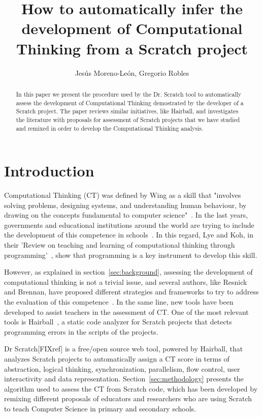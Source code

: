 \documentclass[a4paper,11pt]{article}
\title{How to automatically infer the development of Computational Thinking from a Scratch project}
\author{Jesús Moreno-León, Gregorio Robles}
\begin{document}
\maketitle

\begin{abstract}
In this paper we present the procedure used by the Dr. Scratch tool to automatically assess the development of Computational Thinking  demostrated by the developer of a Scratch project. The paper reviews similar initiatives, like Hairball, and investigates the literature with proposals for assessment of Scratch projects that we have studied and remixed in order to develop the Computational Thinking analysis.

\end{abstract}

\section{Introduction}
Computational Thinking (CT) was defined by Wing as a skill that "involves solving problems, designing systems, and understanding human behaviour, by drawing on the concepts fundamental to computer science"~\cite{wing2006computational}. In the last years, governments and educational institutions around the world are trying to include the development of this competence in schools~\cite{euschoolnet}. In this regard, Lye and Koh, in their 'Review on teaching and learning of computational thinking through programming'~\cite{lye2014review}, show that programming is a key instrument to develop this skill.

However, as explained in section~\ref{sec:background}, assessing the development of computational thinking is not a trivial issue, and several authors, like Resnick and Brennan, have proposed different strategies and frameworks to try to address the evaluation of this competence~\cite{brennan2012new}. In the same line, new tools have been developed to assist teachers in the assessment of CT. One of the most relevant tools is Hairball~\cite{boe2013hairball}, a static code analyzer for Scratch projects that detects programming errors in the scripts of the projects.

Dr Scratch[FIXref] is a free/open source web tool, powered by Hairball, that analyzes Scratch projects to automatically assign a CT score in terms of abstraction, logical thinking, synchronization, parallelism, flow control, user interactivity and data representation. Section~\ref{sec:methodology} presents the algorithm used to assess the CT from Scratch code, which has been developed by remixing different proposals of educators and researchers who are using Scratch to teach Computer Science in primary and secondary schools.
\end{document}
